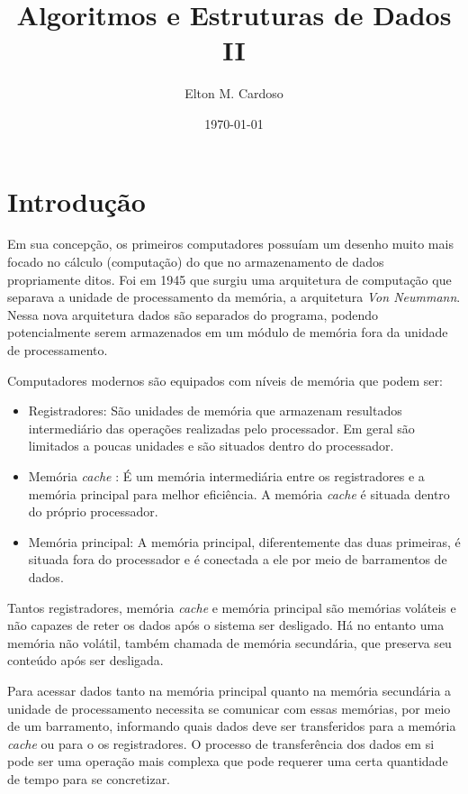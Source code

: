\documentclass[a4paper,11pt]{book}
\title{\bf Algoritmos e Estruturas de Dados II}    %
\author{Elton M. Cardoso}              %
\date{\today}
\begin{document}
\frontmatter                            %
\maketitle                              %
\tableofcontents                        %
\mainmatter       

\chapter{Introdução}
   
   Em sua concepção, os primeiros computadores possuíam um desenho muito mais focado no cálculo (computação)
   do que no armazenamento de dados propriamente ditos. Foi em 1945 que surgiu uma arquitetura de computação que separava
   a unidade de processamento da memória, a arquitetura \emph{Von Neummann}. Nessa nova arquitetura dados são separados 
   do programa, podendo potencialmente serem armazenados em um módulo de memória fora da unidade de processamento.
   
   Computadores modernos são equipados com níveis de memória que podem ser:
   \begin{itemize}
     \item Registradores: São unidades de memória que armazenam resultados intermediário das operações realizadas pelo processador.
     Em geral são limitados a poucas unidades e são situados dentro do processador. 
     \item Memória \emph{cache} :  É um memória intermediária entre os registradores e a memória principal para melhor eficiência.
     A memória \emph{cache} é situada dentro do próprio processador. 
     \item Memória principal: A memória principal, diferentemente das duas primeiras, é situada fora do processador e é conectada a ele
     por meio de barramentos de dados.
   \end{itemize}

   Tantos registradores, memória \emph{cache} e memória principal são memórias voláteis e não capazes de reter os dados 
   após o sistema ser desligado. Há no entanto uma memória não volátil, também chamada de memória secundária, que  preserva seu 
   conteúdo após ser desligada. 
      
   Para acessar dados tanto na memória principal quanto na memória secundária a unidade de processamento necessita se comunicar
   com essas memórias, por meio de um barramento, informando quais dados deve ser transferidos para a memória \emph{cache} ou 
   para o os registradores. O processo de transferência dos dados em si pode ser uma operação mais complexa que pode requerer 
   uma certa quantidade de tempo para se concretizar.
   
\end{document}
